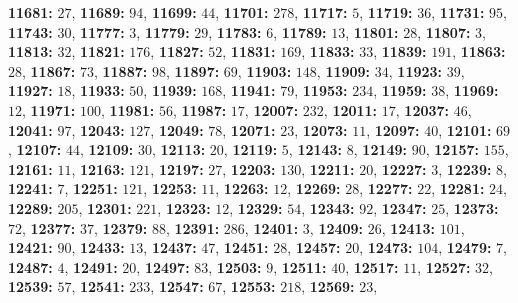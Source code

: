 \textsf{\bfseries 11681:} $27$, \textsf{\bfseries 11689:} $94$, \textsf{\bfseries 11699:} $44$, \textsf{\bfseries 11701:} $278$, \textsf{\bfseries 11717:} $5$, \textsf{\bfseries 11719:} $36$, \textsf{\bfseries 11731:} $95$, \textsf{\bfseries 11743:} $30$, \textsf{\bfseries 11777:} $3$, \textsf{\bfseries 11779:} $29$, \textsf{\bfseries 11783:} $6$, \textsf{\bfseries 11789:} $13$, \textsf{\bfseries 11801:} $28$, \textsf{\bfseries 11807:} $3$, \textsf{\bfseries 11813:} $32$, \textsf{\bfseries 11821:} $176$, \textsf{\bfseries 11827:} $52$, \textsf{\bfseries 11831:} $169$, \textsf{\bfseries 11833:} $33$, \textsf{\bfseries 11839:} $191$, \textsf{\bfseries 11863:} $28$, \textsf{\bfseries 11867:} $73$, \textsf{\bfseries 11887:} $98$, \textsf{\bfseries 11897:} $69$, \textsf{\bfseries 11903:} $148$, \textsf{\bfseries 11909:} $34$, \textsf{\bfseries 11923:} $39$, \textsf{\bfseries 11927:} $18$, \textsf{\bfseries 11933:} $50$, \textsf{\bfseries 11939:} $168$, \textsf{\bfseries 11941:} $79$, \textsf{\bfseries 11953:} $234$, \textsf{\bfseries 11959:} $38$, \textsf{\bfseries 11969:} $12$, \textsf{\bfseries 11971:} $100$, \textsf{\bfseries 11981:} $56$, \textsf{\bfseries 11987:} $17$, \textsf{\bfseries 12007:} $232$, \textsf{\bfseries 12011:} $17$, \textsf{\bfseries 12037:} $46$, \textsf{\bfseries 12041:} $97$, \textsf{\bfseries 12043:} $127$, \textsf{\bfseries 12049:} $78$, \textsf{\bfseries 12071:} $23$, \textsf{\bfseries 12073:} $11$, \textsf{\bfseries 12097:} $40$, \textsf{\bfseries 12101:} $69$, \textsf{\bfseries 12107:} $44$, \textsf{\bfseries 12109:} $30$, \textsf{\bfseries 12113:} $20$, \textsf{\bfseries 12119:} $5$, \textsf{\bfseries 12143:} $8$, \textsf{\bfseries 12149:} $90$, \textsf{\bfseries 12157:} $155$, \textsf{\bfseries 12161:} $11$, \textsf{\bfseries 12163:} $121$, \textsf{\bfseries 12197:} $27$, \textsf{\bfseries 12203:} $130$, \textsf{\bfseries 12211:} $20$, \textsf{\bfseries 12227:} $3$, \textsf{\bfseries 12239:} $8$, \textsf{\bfseries 12241:} $7$, \textsf{\bfseries 12251:} $121$, \textsf{\bfseries 12253:} $11$, \textsf{\bfseries 12263:} $12$, \textsf{\bfseries 12269:} $28$, \textsf{\bfseries 12277:} $22$, \textsf{\bfseries 12281:} $24$, \textsf{\bfseries 12289:} $205$, \textsf{\bfseries 12301:} $221$, \textsf{\bfseries 12323:} $12$, \textsf{\bfseries 12329:} $54$, \textsf{\bfseries 12343:} $92$, \textsf{\bfseries 12347:} $25$, \textsf{\bfseries 12373:} $72$, \textsf{\bfseries 12377:} $37$, \textsf{\bfseries 12379:} $88$, \textsf{\bfseries 12391:} $286$, \textsf{\bfseries 12401:} $3$, \textsf{\bfseries 12409:} $26$, \textsf{\bfseries 12413:} $101$, \textsf{\bfseries 12421:} $90$, \textsf{\bfseries 12433:} $13$, \textsf{\bfseries 12437:} $47$, \textsf{\bfseries 12451:} $28$, \textsf{\bfseries 12457:} $20$, \textsf{\bfseries 12473:} $104$, \textsf{\bfseries 12479:} $7$, \textsf{\bfseries 12487:} $4$, \textsf{\bfseries 12491:} $20$, \textsf{\bfseries 12497:} $83$, \textsf{\bfseries 12503:} $9$, \textsf{\bfseries 12511:} $40$, \textsf{\bfseries 12517:} $11$, \textsf{\bfseries 12527:} $32$, \textsf{\bfseries 12539:} $57$, \textsf{\bfseries 12541:} $233$, \textsf{\bfseries 12547:} $67$, \textsf{\bfseries 12553:} $218$, \textsf{\bfseries 12569:} $23$, 
